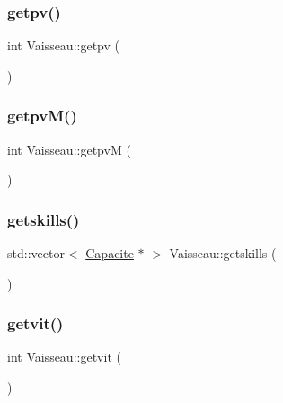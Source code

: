 \subsubsection{\texorpdfstring{getpv()}{getpv()}}
{\footnotesize\ttfamily int Vaisseau\+::getpv (\begin{DoxyParamCaption}{ }\end{DoxyParamCaption})}

\mbox{\label{class_vaisseau_aac552ebb8c5b199c0f0e38b1f1cd95af}} 
\subsubsection{\texorpdfstring{getpv\+M()}{getpvM()}}
{\footnotesize\ttfamily int Vaisseau\+::getpvM (\begin{DoxyParamCaption}{ }\end{DoxyParamCaption})}

\mbox{\label{class_vaisseau_a40cb016e98f0f928b32b3b4a47e27599}} 
\subsubsection{\texorpdfstring{getskills()}{getskills()}}
{\footnotesize\ttfamily std\+::vector$<$ \hyperlink{class_capacite}{Capacite} $\ast$ $>$ Vaisseau\+::getskills (\begin{DoxyParamCaption}{ }\end{DoxyParamCaption})}

\mbox{\label{class_vaisseau_a3ca57eda788c37034f9769d79f814dac}} 
\subsubsection{\texorpdfstring{getvit()}{getvit()}}
{\footnotesize\ttfamily int Vaisseau\+::getvit (\begin{DoxyParamCaption}{ }\end{DoxyParamCaption})}

\mbox{\label{class_vaisseau_a78f7e268cdb61a39e3292e80309a4ca8}} 

